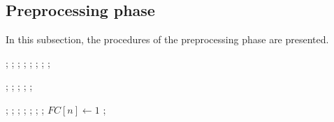 \documentclass[preprint,12pt]{elsarticle}
\begin{document}
\subsection{Preprocessing phase}
In this subsection, the procedures of the preprocessing phase are presented.


\begin{algorithm}\label{alg height}
\begin{algorithmic}[1]
;
          ;
          ;
        \ELSE
         ;
           ;
         \ENDFOR
         ;
         ;
        \ENDIF
\ENDFOR
{};
\end{algorithmic}
\end{algorithm}





\begin{algorithm}\label{alg parent}
\begin{algorithmic}[1]
;
    ;
    ;
  \ENDFOR
  ;
\ENDFOR
{};
\end{algorithmic}
\end{algorithm}

\begin{algorithm}\label{alg FC}
\begin{algorithmic}[1]
;
          ;
        \ELSE
           ;
           ;
         \ENDFOR
         ;
         ;
         ;
        \ENDIF
\ENDFOR
\STATE$FC[n] \leftarrow 1$
;
\end{algorithmic}
\end{algorithm}
$\;$\\
\end{document}
